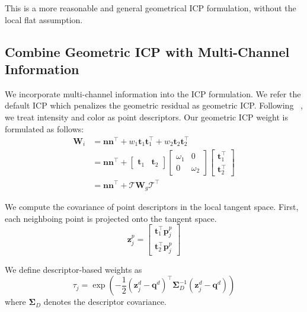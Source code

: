 This is a more reasonable and general geometrical ICP formulation, without the local flat assumption. 

\newpage
\subsection{Combine Geometric ICP with Multi-Channel Information}
We incorporate multi-channel information into the ICP formulation. We refer the default ICP which penalizes the geometric residual as geometric ICP. Following ~\citep{servos2017multi}, we treat intensity and color as point descriptors. Our geometric ICP weight is formulated as follows:
\begin{equation}
    \begin{split}
        \mathbf{W}_i &= \mathbf{n}\mathbf{n}^\top + w_1\mathbf{t}_1\mathbf{t}_1^\top + w_2\mathbf{t}_2\mathbf{t}_2^\top \\
        &= \mathbf{n}\mathbf{n}^\top + \begin{bmatrix}
            \mathbf{t}_1  & \mathbf{t}_2
        \end{bmatrix}\begin{bmatrix}
            \omega_1  & 0 \\
            0  &\omega_2
        \end{bmatrix} \begin{bmatrix}
            \mathbf{t}_1^{\top}  \\ \mathbf{t}_2^{\top}         
        \end{bmatrix} \\
        &= \mathbf{n}\mathbf{n}^\top + \mathcal{T} \mathbf{W}_g \mathcal{T}^{\top}
    \end{split}
\end{equation}

We compute the covariance of point descriptors in the local tangent space. First, each neighboing point is projected onto the tangent space. 
\begin{equation}
    \mathbf{z}_j^p = \begin{bmatrix}
        \mathbf{t}_1^{\top}\mathbf{p}_j^{p} \\
        \mathbf{t}_2^{\top}\mathbf{p}_j^{p}
    \end{bmatrix}
\end{equation}

We define descriptor-based weights as
\begin{equation}
    \tau_j = \exp{\left(-\frac{1}{2}(\mathbf{z}_j^{d} - \mathbf{q}^{d})^{\top}\bm{\Sigma}_{D}^{-1}(\mathbf{z}_j^{d} - \mathbf{q}^{d})\right)} 
\end{equation}
where $\bm{\Sigma}_{D}$ denotes the descriptor covariance.


